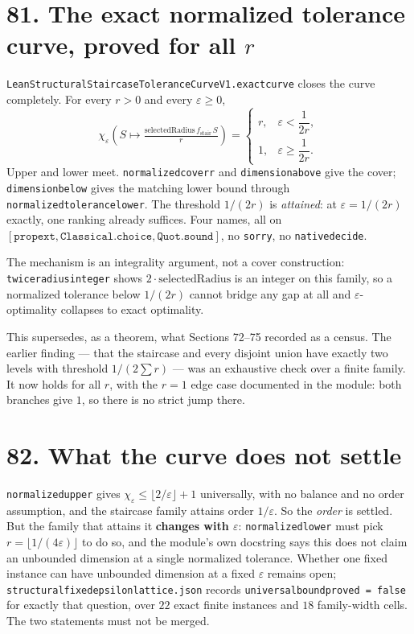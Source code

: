 \documentclass[9pt,twocolumn]{article}
\renewcommand{\_}{\CIGunderscore\allowbreak}
\begin{document}
\section*{81. The exact normalized tolerance curve, proved for all $r$}
\texttt{LeanStructuralStaircaseToleranceCurveV1.exact\_curve} closes the curve completely. For every $r>0$ and every $\varepsilon \ge 0$,
\[
\chi_\varepsilon\!\left(S \mapsto \tfrac{\mathrm{selectedRadius}\, f_{\text{stair}}\, S}{r}\right)
= \begin{cases} r, & \varepsilon < \dfrac{1}{2r},\\[4pt] 1, & \varepsilon \ge \dfrac{1}{2r}. \end{cases}
\]
Upper and lower meet. \texttt{normalized\_cover\_r} and \texttt{dimension\_above} give the cover; \texttt{dimension\_below} gives the matching lower bound through \texttt{normalized\_tolerance\_lower}. The threshold $1/(2r)$ is \emph{attained}: at $\varepsilon = 1/(2r)$ exactly, one ranking already suffices. Four names, all on $[\texttt{propext}, \texttt{Classical.choice}, \texttt{Quot.sound}]$, no \texttt{sorry}, no \texttt{native\_decide}.

The mechanism is an integrality argument, not a cover construction: \texttt{twice\_radius\_integer} shows $2\cdot\mathrm{selectedRadius}$ is an integer on this family, so a normalized tolerance below $1/(2r)$ cannot bridge any gap at all and $\varepsilon$-optimality collapses to exact optimality.

This supersedes, as a theorem, what Sections 72--75 recorded as a census. The earlier finding --- that the staircase and every disjoint union have exactly two levels with threshold $1/(2\sum r)$ --- was an exhaustive check over a finite family. It now holds for all $r$, with the $r=1$ edge case documented in the module: both branches give $1$, so there is no strict jump there.

\section*{82. What the curve does not settle}
\texttt{normalized\_upper} gives $\chi_\varepsilon \le \lfloor 2/\varepsilon\rfloor + 1$ universally, with no balance and no order assumption, and the staircase family attains order $1/\varepsilon$. So the \emph{order} is settled. But the family that attains it \textbf{changes with $\varepsilon$}: \texttt{normalized\_lower} must pick $r = \lfloor 1/(4\varepsilon)\rfloor$ to do so, and the module's own docstring says this does not claim an unbounded dimension at a single normalized tolerance. Whether one fixed instance can have unbounded dimension at a fixed $\varepsilon$ remains open; \texttt{structural\_fixed\_epsilon\_lattice.json} records \texttt{universal\_bound\_proved = false} for exactly that question, over $22$ exact finite instances and $18$ family-width cells. The two statements must not be merged.
\end{document}
